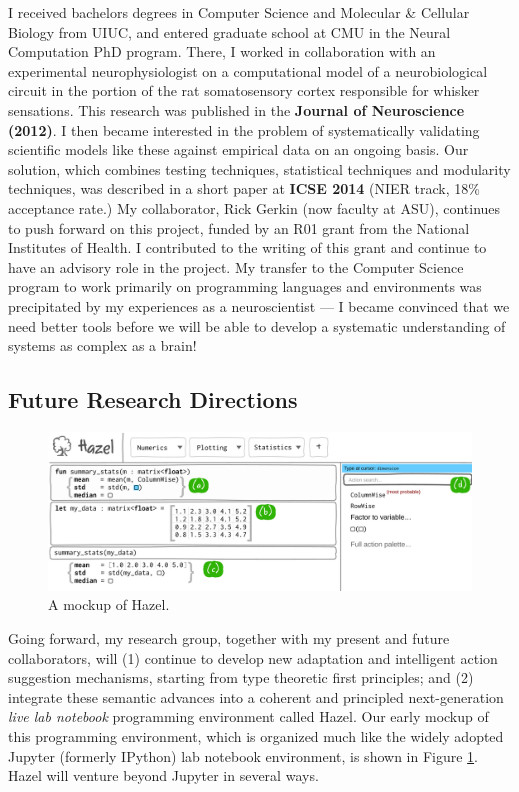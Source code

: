 \documentclass[10pt]{article}
\begin{document}
I received bachelors degrees in Computer Science and Molecular \& Cellular Biology from UIUC, and entered graduate school at CMU in the Neural Computation PhD program. There, I worked in collaboration with an experimental neurophysiologist on a computational model of a neurobiological circuit in the portion of the rat somatosensory cortex responsible for whisker sensations. This research was published in the \textbf{Journal of Neuroscience (2012)}. I then became interested in the problem of systematically validating scientific models like these against empirical data on an ongoing basis. Our solution, which combines testing techniques, statistical techniques and modularity techniques, was described in a short paper at \textbf{ICSE 2014} (NIER track, 18\% acceptance rate.) My collaborator, Rick Gerkin (now faculty at ASU), continues to push forward on this project, funded by an R01 grant from the National Institutes of Health. I contributed to the writing of this grant and continue to have an advisory role in the project. My transfer to the Computer Science program to work primarily on programming languages and environments was precipitated by my experiences as a neuroscientist --- I became convinced that we need better tools before we will be able to develop a systematic understanding of systems as complex as a brain!



\subsection*{Future Research Directions}
\begin{figure}
\includegraphics[width=\textwidth]{mockup-1}
\vspace{-3ex}
\caption{A mockup of Hazel.}
\label{fig:hazel-mockup}
\vspace{-2ex}
\end{figure}

Going forward, my research group, together with my present and future collaborators, will (1) continue to develop new adaptation and intelligent action suggestion mechanisms, starting from type theoretic first principles; and (2) integrate these semantic advances into a coherent and principled next-generation \emph{live lab notebook} programming environment called Hazel. Our early mockup of this programming environment, which is organized much like the widely adopted Jupyter (formerly IPython) lab notebook environment, is shown in Figure \ref{fig:hazel-mockup}. Hazel will venture beyond Jupyter in several ways.
\end{document}
